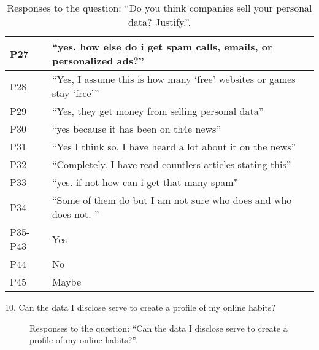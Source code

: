 \begin{table}[H]
\begin{longtable}{p{3cm} p{13cm}}
        P27 & ``yes. how else do i get spam calls, emails, or personalized ads?'' \\
        \hline
        P28 & ``Yes, I assume this is how many `free' websites or games stay `free''' \\
        \hline
        P29 & ``Yes, they get money from selling personal data'' \\
        \hline
        P30 & ``yes because it has been on th4e news'' \\
        \hline
        P31 & ``Yes I think so, I have heard a lot about it on the news'' \\
        \hline
        P32 & ``Completely. I have read countless articles stating this'' \\
        \hline
        P33 & ``yes. if not how can i get that many spam'' \\
        \hline
        P34 & ``Some of them do but I am not sure who does and who does not. '' \\
        \hline
        P35-P43 & Yes \\
        \hline
        P44 & No \\
        \hline
        P45 & Maybe \\
        \hline
    \end{longtable}
    \vspace{1em}
    \caption{Responses to the question: ``Do you think companies sell your personal data? Justify.''.}
    \label{table:survey_s5_q9}
\end{table}

10. Can the data I disclose serve to create a profile of my online habits?

\begin{figure}[H]
    \begin{center}
        \caption{Responses to the question: ``Can the data I disclose serve to create a profile of my online habits?''.}
        \label{fig:survey_s5_q10}
    \end{center}
\end{figure}

